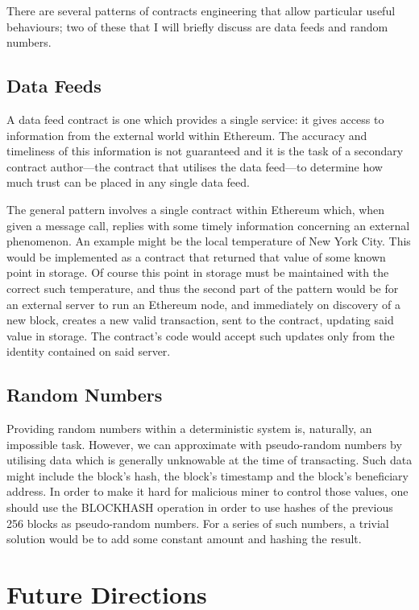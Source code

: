 \documentclass[9pt,oneside]{amsart}
\begin{document}
\begin{multicols}{2}
There are several patterns of contracts engineering that allow particular useful behaviours; two of these that I will briefly discuss are data feeds and random numbers.

\subsection{Data Feeds}
A data feed contract is one which provides a single service: it gives access to information from the external world within Ethereum. The accuracy and timeliness of this information is not guaranteed and it is the task of a secondary contract author---the contract that utilises the data feed---to determine how much trust can be placed in any single data feed.

The general pattern involves a single contract within Ethereum which, when given a message call, replies with some timely information concerning an external phenomenon. An example might be the local temperature of New York City. This would be implemented as a contract that returned that value of some known point in storage. Of course this point in storage must be maintained with the correct such temperature, and thus the second part of the pattern would be for an external server to run an Ethereum node, and immediately on discovery of a new block, creates a new valid transaction, sent to the contract, updating said value in storage. The contract's code would accept such updates only from the identity contained on said server.

\subsection{Random Numbers}
Providing random numbers within a deterministic system is, naturally, an impossible task. However, we can approximate with pseudo-random numbers by utilising data which is generally unknowable at the time of transacting. Such data might include the block's hash, the block's timestamp and the block's beneficiary address. In order to make it hard for malicious miner to control those values, one should use the {\small BLOCKHASH} operation in order to use hashes of the previous 256 blocks as pseudo-random numbers. For a series of such numbers, a trivial solution would be to add some constant amount and hashing the result.

\section{Future Directions} \label{ch:future}


\end{multicols}
\end{document}

